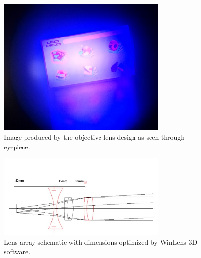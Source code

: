 \documentclass[12pt,a4paper]{article}
\begin{document}
\begin{appendices}
\begin{figure}[h]
	\centering
	\includegraphics[width = 0.75\textwidth]{pics/objective_lens_output.jpg}
	\caption[Objective Lens Output]{\centering Image produced by the objective lens design as seen through eyepiece.}
	\label{OLO}
\end{figure}

\begin{figure}[h]
	\centering
	\includegraphics[width = 0.75\textwidth]{pics/lens_array.jpg}
	\caption[Lens Array Diagram]{\centering Lens array schematic with dimensions optimized by WinLens 3D software.}
	\label{LAD}
\end{figure}


\end{appendices}
\end{document}
